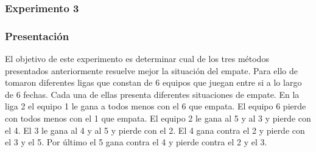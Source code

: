         \subsubsection{Experimento 3}
        \subsubsection*{Presentación}
        El objetivo de este experimento es determinar cual de los tres métodos presentados anteriormente resuelve mejor la situación del empate. Para ello de tomaron diferentes ligas que constan de 6 equipos que juegan entre si a lo largo de 6 fechas. Cada una de ellas presenta diferentes situaciones de empate.
        En la liga 2 el equipo 1 le gana a todos menos con el 6 que empata. El equipo 6 pierde con todos menos con el 1 que empata. El equipo 2 le gana al 5 y al 3 y pierde con el 4. El 3 le gana al 4 y al 5 y pierde con el 2. El 4 gana contra el 2 y pierde con el 3 y el 5. Por último el 5 gana contra el 4 y pierde contra el 2 y el 3.
